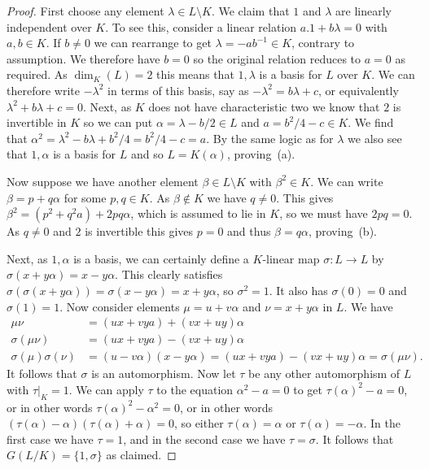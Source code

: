 \documentclass{amsart}
\newcommand{\al}        {\alpha}
\newcommand{\bt}        {\beta}
\newcommand{\lm}        {\lambda}
\newcommand{\sg}        {\sigma}
\newcommand{\sm}        {\setminus}
\renewcommand{\:}{\colon}
\theoremstyle{definition}
\begin{document}
\begin{proof}
 First choose any element $\lm\in L\sm K$.  We claim that $1$ and
 $\lm$ are linearly independent over $K$.  To see this, consider a
 linear relation $a.1+b\lm=0$ with $a,b\in K$.  If $b\neq 0$ we can
 rearrange to get $\lm=-ab^{-1}\in K$, contrary to assumption.  We
 therefore have $b=0$ so the original relation reduces to $a=0$ as
 required.  As $\dim_K(L)=2$ this means that $1,\lm$ is a basis for
 $L$ over $K$.  We can therefore write $-\lm^2$ in terms of this
 basis, say as $-\lm^2=b\lm+c$, or equivalently $\lm^2+b\lm+c=0$.
 Next, as $K$ does not have characteristic two we know that $2$ is
 invertible in $K$ so we can put $\al=\lm-b/2\in L$ and
 $a=b^2/4-c\in K$.  We find that
 $\al^2=\lm^2-b\lm+b^2/4=b^2/4-c=a$.  By the same logic as for
 $\lm$ we also see that $1,\al$ is a basis for $L$ and so $L=K(\al)$,
 proving~(a). 

 Now suppose we have another element $\bt\in L\sm K$ with
 $\bt^2\in K$.  We can write $\bt=p+q\al$ for some $p,q\in K$.  As
 $\bt\not\in K$ we have $q\neq 0$.  This gives
 $\bt^2=(p^2+q^2a)+2pq\al$, which is assumed to lie in $K$, so we must
 have $2pq=0$.  As $q\neq 0$ and $2$ is invertible this gives $p=0$
 and thus $\bt=q\al$, proving~(b).

 Next, as $1,\al$ is a basis, we can certainly define a $K$-linear map
 $\sg\:L\to L$ by $\sg(x+y\al)=x-y\al$.  This clearly satisfies
 $\sg(\sg(x+y\al))=\sg(x-y\al)=x+y\al$, so $\sg^2=1$.  It also has
 $\sg(0)=0$ and $\sg(1)=1$.  Now consider elements $\mu=u+v\al$ and
 $\nu=x+y\al$ in $L$.  We have 
 \begin{align*}
  \mu\nu &= (ux+vya)+(vx+uy)\al \\
  \sg(\mu\nu) &= (ux+vya)-(vx+uy)\al \\
  \sg(\mu)\sg(\nu) &= (u-v\al)(x-y\al) = (ux+vya)-(vx+uy)\al 
    = \sg(\mu\nu). 
 \end{align*}
 It follows that $\sg$ is an automorphism.  Now let $\tau$ be any
 other automorphism of $L$ with $\tau|_K=1$.  We can apply $\tau$ to
 the equation $\al^2-a=0$ to get $\tau(\al)^2-a=0$, or in other words
 $\tau(\al)^2-\al^2=0$, or in other words
 $(\tau(\al)-\al)(\tau(\al)+\al)=0$, so either $\tau(\al)=\al$ or
 $\tau(\al)=-\al$.  In the first case we have $\tau=1$, and in the
 second case we have $\tau=\sg$.  It follows that $G(L/K)=\{1,\sg\}$
 as claimed.
\end{proof}
\end{document}

